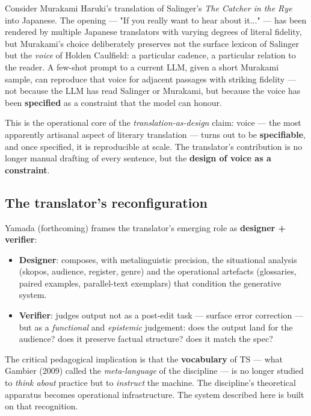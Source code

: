 \documentclass[11pt]{article}
\begin{document}
Consider Murakami Haruki's translation of Salinger's \emph{The Catcher in the Rye} into Japanese. The opening --- "If you really want to hear about it..." --- has been rendered by multiple Japanese translators with varying degrees of literal fidelity, but Murakami's choice deliberately preserves not the surface lexicon of Salinger but the \emph{voice} of Holden Caulfield: a particular cadence, a particular relation to the reader. A few-shot prompt to a current LLM, given a short Murakami sample, can reproduce that voice for adjacent passages with striking fidelity --- not because the LLM has read Salinger or Murakami, but because the voice has been \textbf{specified} as a constraint that the model can honour.

This is the operational core of the \emph{translation-as-design} claim: voice --- the most apparently artisanal aspect of literary translation --- turns out to be \textbf{specifiable}, and once specified, it is reproducible at scale. The translator's contribution is no longer manual drafting of every sentence, but the \textbf{design of voice as a constraint}.

\subsection{The translator's reconfiguration}

Yamada (forthcoming) frames the translator's emerging role as \textbf{designer + verifier}:

\begin{itemize}[leftmargin=*]
\item \textbf{Designer}: composes, with metalinguistic precision, the situational analysis (skopos, audience, register, genre) and the operational artefacts (glossaries, paired examples, parallel-text exemplars) that condition the generative system.
\item \textbf{Verifier}: judges output not as a post-edit task --- surface error correction --- but as a \emph{functional} and \emph{epistemic} judgement: does the output land for the audience? does it preserve factual structure? does it match the spec?
\end{itemize}

The critical pedagogical implication is that the \textbf{vocabulary} of TS --- what Gambier (2009) called the \emph{meta-language} of the discipline --- is no longer studied to \emph{think about} practice but to \emph{instruct} the machine. The discipline's theoretical apparatus becomes operational infrastructure. The system described here is built on that recognition.
\end{document}
